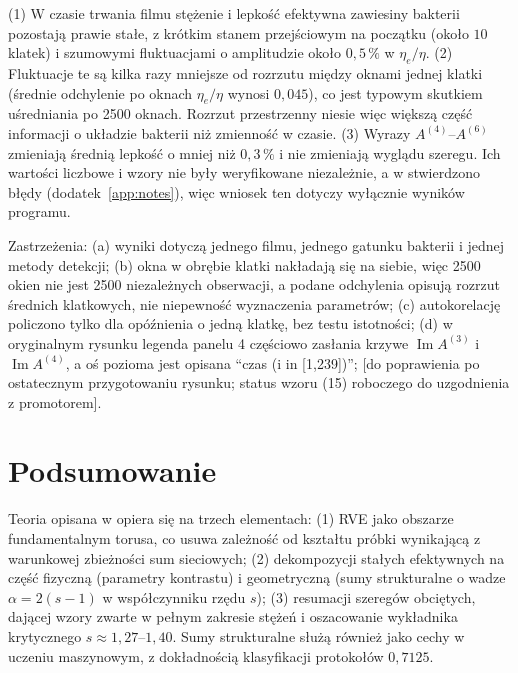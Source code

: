 \documentclass[12pt,a4paper,twoside,openright]{report}
\theoremstyle{definition}
\theoremstyle{remark}
\newcommand{\czer}[1]{{\color{red}#1}}
\newcommand{\ziel}[1]{{\color{green!50!black}#1}}
\renewcommand{\Im}{\operatorname{Im}}
\begin{document}
\ziel{(1) W czasie trwania filmu stężenie i lepkość efektywna zawiesiny bakterii pozostają prawie stałe, z krótkim stanem przejściowym na początku (około $10$ klatek) i szumowymi fluktuacjami o amplitudzie około $0{,}5\,\%$ w $\eta_e/\eta$. (2) Fluktuacje te są kilka razy mniejsze od rozrzutu między oknami jednej klatki (średnie odchylenie po oknach $\eta_e/\eta$ wynosi $0{,}045$), co jest typowym skutkiem uśredniania po 2500 oknach. Rozrzut przestrzenny niesie więc większą część informacji o układzie bakterii niż zmienność w czasie. (3) Wyrazy $A^{(4)}$--$A^{(6)}$ zmieniają średnią lepkość o mniej niż $0{,}3\,\%$ i nie zmieniają wyglądu szeregu. Ich wartości liczbowe i wzory nie były weryfikowane niezależnie, a w \cite{czapla2025computational} stwierdzono błędy (dodatek~\ref{app:notes}), więc wniosek ten dotyczy wyłącznie wyników programu.}

\ziel{Zastrzeżenia: (a) wyniki dotyczą jednego filmu, jednego gatunku bakterii i jednej metody detekcji; (b) okna w obrębie klatki nakładają się na siebie, więc 2500 okien nie jest 2500 niezależnych obserwacji, a podane odchylenia opisują rozrzut średnich klatkowych, nie niepewność wyznaczenia parametrów; (c) autokorelację policzono tylko dla opóźnienia o jedną klatkę, bez testu istotności; (d) w oryginalnym rysunku legenda panelu 4 częściowo zasłania krzywe $\Im A^{(3)}$ i $\Im A^{(4)}$, a oś pozioma jest opisana ``czas (i in [1,239])''; \czer{[do poprawienia po ostatecznym przygotowaniu rysunku; status wzoru (15) roboczego do uzgodnienia z promotorem]}.}

\chapter{Podsumowanie}

Teoria opisana w \cite{mityushev2025computational,czapla2025computational,mityushev2025computationalpart3} opiera się na trzech elementach: (1) RVE jako obszarze fundamentalnym torusa, co usuwa zależność od kształtu próbki wynikającą z warunkowej zbieżności sum sieciowych; (2) dekompozycji stałych efektywnych na część fizyczną (parametry kontrastu) i geometryczną (sumy strukturalne o wadze $\alpha=2(s-1)$ w współczynniku rzędu $s$); (3) resumacji szeregów obciętych, dającej wzory zwarte w pełnym zakresie stężeń i oszacowanie wykładnika krytycznego $s\approx1{,}27$--$1{,}40$. Sumy strukturalne służą również jako cechy w uczeniu maszynowym, z dokładnością klasyfikacji protokołów $0{,}7125$.
\end{document}
